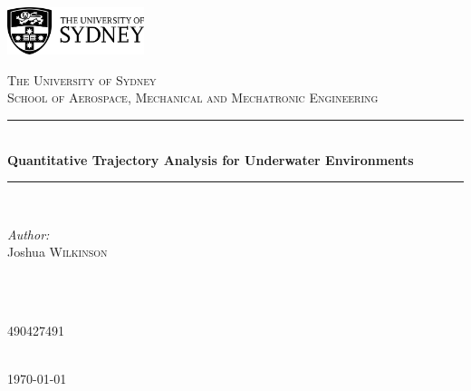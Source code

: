 \documentclass[12pt]{article}
\title{}
\begin{document}
\begin{titlepage}

\newcommand{\HRule}{\rule{\linewidth}{0.5mm}} 

\begin{flushright}
\includegraphics[width=0.3\textwidth]{images/usydNew.png}\\[2cm]
\end{flushright}


\center 

\vspace{2cm}
\textsc{\LARGE The University of Sydney}\\[0.75cm]
\textsc{\Large School of Aerospace, Mechanical and Mechatronic Engineering}\\[1cm]


\HRule \\[0.4cm]
{ \huge \bfseries Quantitative Trajectory Analysis for Underwater Environments}\\[0.4cm] 
\HRule \\[1.25cm]
 

\begin{minipage}{0.4\textwidth}
\begin{flushleft} \large
\emph{Author:}\\
Joshua \textsc{Wilkinson}\\
\end{flushleft}
\end{minipage}
~
\begin{minipage}{0.4\textwidth}
\begin{flushright} \large\emph{}\\
\textsc{490427491}\\
\end{flushright}
\end{minipage}\\[1.5cm]



{\large \today}\\[1.5cm]



\vfill

\end{titlepage}
\newpage
\cfoot{}
\rhead{}
\thispagestyle{fancy}
\pagestyle{fancy}
\end{document}
